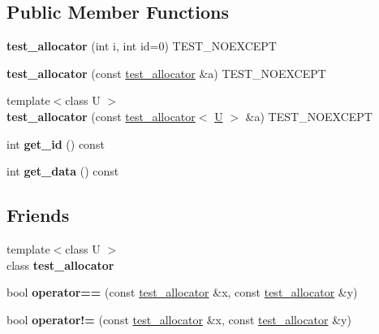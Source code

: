 \subsection*{Public Member Functions}
\begin{DoxyCompactItemize}
\item 
\mbox{\label{classtest__allocator_3_01void_01_4_ac6bfd6038900591bd6e9635a0e099e0f}} 
{\bfseries test\+\_\+allocator} (int i, int id=0) T\+E\+S\+T\+\_\+\+N\+O\+E\+X\+C\+E\+PT
\item 
\mbox{\label{classtest__allocator_3_01void_01_4_a1f9bd0aaf82a4d54fd79312a33d4a32c}} 
{\bfseries test\+\_\+allocator} (const \mbox{\hyperlink{classtest__allocator}{test\+\_\+allocator}} \&a) T\+E\+S\+T\+\_\+\+N\+O\+E\+X\+C\+E\+PT
\item 
\mbox{\label{classtest__allocator_3_01void_01_4_a8bed72b56d19f8def78032ab5a4bef18}} 
{\footnotesize template$<$class U $>$ }\\{\bfseries test\+\_\+allocator} (const \mbox{\hyperlink{classtest__allocator}{test\+\_\+allocator}}$<$ \mbox{\hyperlink{union_u}{U}} $>$ \&a) T\+E\+S\+T\+\_\+\+N\+O\+E\+X\+C\+E\+PT
\item 
\mbox{\label{classtest__allocator_3_01void_01_4_a953e4c5891ce50f38cd5e243d05074e3}} 
int {\bfseries get\+\_\+id} () const
\item 
\mbox{\label{classtest__allocator_3_01void_01_4_ae089c10ea17aa4d642fb7d4fae72e911}} 
int {\bfseries get\+\_\+data} () const
\end{DoxyCompactItemize}
\subsection*{Friends}
\begin{DoxyCompactItemize}
\item 
\mbox{\label{classtest__allocator_3_01void_01_4_a8a679cbfef131387d1d1c5f32f936ad0}} 
{\footnotesize template$<$class U $>$ }\\class {\bfseries test\+\_\+allocator}
\item 
\mbox{\label{classtest__allocator_3_01void_01_4_aac919e1c35caa86812a1e8ceee0a2267}} 
bool {\bfseries operator==} (const \mbox{\hyperlink{classtest__allocator}{test\+\_\+allocator}} \&x, const \mbox{\hyperlink{classtest__allocator}{test\+\_\+allocator}} \&y)
\item 
\mbox{\label{classtest__allocator_3_01void_01_4_a1a834e72480aa7b535e9ec4db1d64743}} 
bool {\bfseries operator!=} (const \mbox{\hyperlink{classtest__allocator}{test\+\_\+allocator}} \&x, const \mbox{\hyperlink{classtest__allocator}{test\+\_\+allocator}} \&y)
\end{DoxyCompactItemize}
